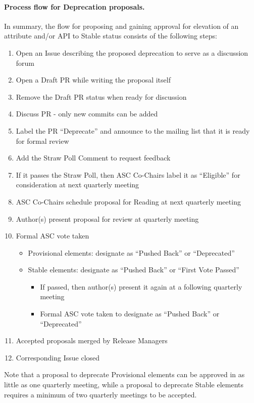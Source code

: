 \documentclass{article}
\providecommand{\tightlist}{%
  \setlength{\itemsep}{0pt}\setlength{\parskip}{0pt}}
\begin{document}
\hypertarget{process-flow-for-deprecation-proposals}{%
\paragraph{Process flow for Deprecation
proposals.}\label{process-flow-for-deprecation-proposals}}

In summary, the flow for proposing and gaining approval for elevation of
an attribute and/or API to Stable status consists of the following
steps:

\begin{enumerate}
\def\labelenumi{\arabic{enumi}.}
\tightlist
\item
  Open an Issue describing the proposed deprecation to serve as a
  discussion forum
\item
  Open a Draft PR while writing the proposal itself
\item
  Remove the Draft PR status when ready for discussion
\item
  Discuss PR - only new commits can be added
\item
  Label the PR ``Deprecate'' and announce to the mailing list that it is
  ready for formal review
\item
  Add the Straw Poll Comment to request feedback
\item
  If it passes the Straw Poll, then ASC Co-Chairs label it as
  ``Eligible'' for consideration at next quarterly meeting
\item
  ASC Co-Chairs schedule proposal for Reading at next quarterly
  meeting
\item
  Author(s) present proposal for review at quarterly meeting
\item
  Formal ASC vote taken

  \begin{itemize}
  \tightlist
  \item
    Provisional elements: designate as ``Pushed Back'' or
    ``Deprecated''
  \item
    Stable elements: designate as ``Pushed Back'' or ``First Vote
    Passed''

    \begin{itemize}
    \tightlist
    \item
      If passed, then author(s) present it again at a following
      quarterly meeting
    \item
      Formal ASC vote taken to designate as ``Pushed Back'' or
      ``Deprecated''
    \end{itemize}
  \end{itemize}
\item
  Accepted proposals merged by Release Managers
\item
  Corresponding Issue closed
\end{enumerate}

Note that a proposal to deprecate Provisional elements can be
approved in as little as one quarterly meeting, while a proposal to
deprecate Stable elements requires a minimum of two quarterly
meetings to be accepted.
\end{document}
